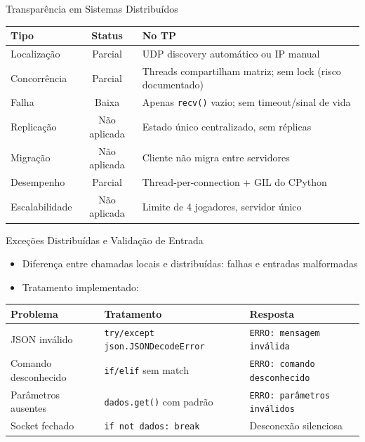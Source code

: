 \documentclass[aspectratio=169]{beamer}
\begin{document}
\begin{frame}{Transpar\^encia em Sistemas Distribu\'idos}
  \footnotesize
  \begin{tabular}{>{\raggedright\arraybackslash}p{3cm}c>{\raggedright\arraybackslash}p{7.5cm}}
    \toprule
    \textbf{Tipo} & \textbf{Status} & \textbf{No TP} \\
    \midrule
    Localiza\c{c}\~ao & Parcial & UDP discovery autom\'atico ou IP manual \\
    Concorr\^encia & Parcial & Threads compartilham matriz; sem lock (risco documentado) \\
    Falha & Baixa & Apenas \texttt{recv()} vazio; sem timeout/sinal de vida \\
    Replica\c{c}\~ao & N\~ao aplicada & Estado \'unico centralizado, sem r\'eplicas \\
    Migra\c{c}\~ao & N\~ao aplicada & Cliente n\~ao migra entre servidores \\
    Desempenho & Parcial & Thread-per-connection + GIL do CPython \\
    Escalabilidade & N\~ao aplicada & Limite de 4 jogadores, servidor \'unico \\
    \bottomrule
  \end{tabular}
\end{frame}

\begin{frame}{Exce\c{c}\~oes Distribu\'idas e Valida\c{c}\~ao de Entrada}
  \begin{itemize}
    \item Diferen\c{c}a entre chamadas locais e distribu\'idas: falhas e entradas malformadas
    \item Tratamento implementado:
  \end{itemize}
  \vfill
  \footnotesize
  \begin{tabular}{>{\raggedright\arraybackslash}p{4cm}>{\raggedright\arraybackslash}p{4cm}>{\raggedright\arraybackslash}p{4cm}}
    \toprule
    \textbf{Problema} & \textbf{Tratamento} & \textbf{Resposta} \\
    \midrule
    JSON inv\'alido & \texttt{try/except json.JSONDecodeError} & \texttt{ERRO: mensagem inv\'alida} \\
    Comando desconhecido & \texttt{if/elif} sem match & \texttt{ERRO: comando desconhecido} \\
    Par\^ametros ausentes & \texttt{dados.get()} com padr\~ao & \texttt{ERRO: par\^ametros inv\'alidos} \\
    Socket fechado & \texttt{if not dados: break} & Desconex\~ao silenciosa \\
    \bottomrule
  \end{tabular}
\end{frame}
\end{document}
